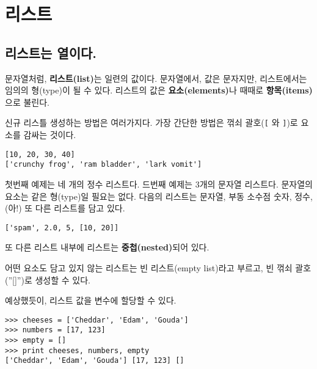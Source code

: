 
\chapter{리스트}



\section{리스트는 열이다.}

문자열처럼, {\bf 리스트(list)}는 일련의 값이다. 문자열에서, 값은 문자지만, 리스트에서는 임의의 형(type)이 될 수 있다.
리스트의 값은 {\bf 요소(elements)}나 때때로 {\bf 항목(items)}으로 불린다.


신규 리스틀 생성하는 방법은 여러가지다. 가장 간단한 방법은 꺾쇠 괄호(\verb"[" 와 \verb"]")로 요소를 감싸는 것이다.

\beforeverb
\begin{verbatim}
[10, 20, 30, 40]
['crunchy frog', 'ram bladder', 'lark vomit']
\end{verbatim}
\afterverb
%
첫번째 예제는 네 개의 정수 리스트다. 드번째 예제는 3개의 문자열 리스트다.
문자열의 요소는 같은 형(type)일 필요는 없다. 다음의 리스트는 문자열, 부동 소수점 숫자, 정수, (아!) 또 다른 리스트를 담고 있다.

\beforeverb
\begin{verbatim}
['spam', 2.0, 5, [10, 20]]
\end{verbatim}
\afterverb
%

또 다른 리스트 내부에 리스트는 {\bf 중첩(nested)}되어 있다.


어떤 요소도 담고 있지 않는 리스트는 빈 리스트(empty list)라고 부르고, 빈 꺾쇠 괄호(''[]'')로 생성할 수 있다.


예상했듯이, 리스트 값을 변수에 할당할 수 있다.

\beforeverb
\begin{verbatim}
>>> cheeses = ['Cheddar', 'Edam', 'Gouda']
>>> numbers = [17, 123]
>>> empty = []
>>> print cheeses, numbers, empty
['Cheddar', 'Edam', 'Gouda'] [17, 123] []
\end{verbatim}
\afterverb
%


